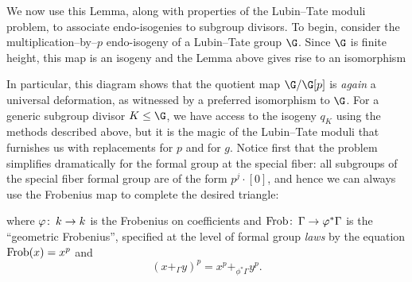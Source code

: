 We now use this Lemma, along with properties of the Lubin--Tate moduli problem, to associate endo-isogenies to subgroup divisors.  To begin, consider the multiplication--by--$p$ endo-isogeny of a Lubin--Tate group $\G$.  Since $\G$ is finite height, this map is an isogeny and the Lemma above gives rise to an isomorphism
\begin{center}
\end{center}
In particular, this diagram shows that the quotient map $\G / \G[p]$ is \emph{again} a universal deformation, as witnessed by a preferred isomorphism to $\G$.  For a generic subgroup divisor $K \le \G$, we have access to the isogeny $q_K$ using the methods described above, but it is the magic of the Lubin--Tate moduli that furnishes us with replacements for $p$ and for $g$.  Notice first that the problem simplifies dramatically for the formal group at the special fiber: all subgroups of the special fiber formal group are of the form $p^j \cdot [0]$, and hence we can always use the Frobenius map to complete the desired triangle:
\begin{center}
\end{center}
where $\varphi\colon\thinspace k \to k$ is the Frobenius on coefficients and $\operatorname{Frob}\colon\thinspace \Gamma \to \varphi^* \Gamma$ is the ``geometric Frobenius'', specified at the level of formal group \emph{laws} by the equation $\operatorname{Frob}(x) = x^p$ and \[(x +_\Gamma y)^p = x^p +_{\phi^* \Gamma} y^p.\]

